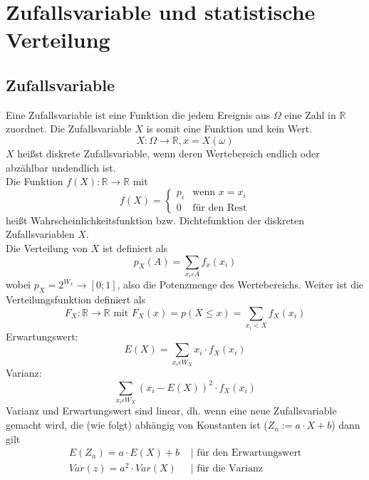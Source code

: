 \documentclass[a4paper]{scrartcl}
\begin{document}
    \section{Zufallsvariable und statistische Verteilung}
        \subsection{Zufallsvariable}
            Eine Zufallsvariable ist eine Funktion die jedem Ereignis aus \(\Omega\) eine Zahl in \(\mathbb{R}\) zuordnet. Die Zufallsvariable \(X\) is somit eine Funktion und kein Wert.
            \begin{equation*}
                X: \Omega \rightarrow \mathbb{R}, x=X(\omega)
            \end{equation*}
            \(X\) heißst diskrete Zufallsvariable, wenn deren Wertebereich endlich oder abzählbar undendlich ist. \\
            Die Funktion  \(f(X): \mathbb{R} \rightarrow \mathbb{R}\) mit 
            \[f(X)=
                \begin{cases}
                    p_i & \text{wenn } x=x_i\\
                    0 & \text{für den Rest} 
                \end{cases}
            \] 
            heißt Wahrscheinlichkeitsfunktion bzw. Dichtefunktion der diskreten Zufallsvariablen \(X\). \\
            Die Verteilung von \(X\) ist definiert als 
            \begin{equation*}
                p_X(A) = \sum\limits_{x_i \varepsilon A} f_x(x_i)
            \end{equation*}
            wobei \(p_X = 2^{W_x} \rightarrow [0;1] \), also die Potenzmenge des Wertebereichs. Weiter ist die Verteilungsfunktion definiert als 
            \begin{equation*}
                F_X: \mathbb{R} \rightarrow \mathbb{R} \text{ mit } F_X (x) = p(X \le x) = \sum\limits_{x_i < X} f_X(x_i)
            \end{equation*}
            Erwartungswert:
            \begin{equation*}
                E(X) = \sum\limits_{x_i \epsilon W_X} x_i \cdot f_X (x_i)
            \end{equation*}
            Varianz:
            \begin{equation*}
                \sum\limits_{x_i \epsilon W_X} (x_i - E(X))^2 \cdot f_X(x_i)
            \end{equation*}
            Varianz und Erwartungswert sind linear, dh. wenn eine neue Zufallsvariable gemacht wird, die (wie folgt) abhängig von Konstanten ist (\(Z_n := a \cdot X + b\)) dann gilt
            \begin{equation*}
                \begin{aligned}
                    E(Z_n) = a \cdot E(X) + b & \text{ | für den Erwartungswert}\\
                    Var(z) = a^2 \cdot Var(X) & \text{ | für die Varianz}
                \end{aligned}
            \end{equation*}  
\end{document}
